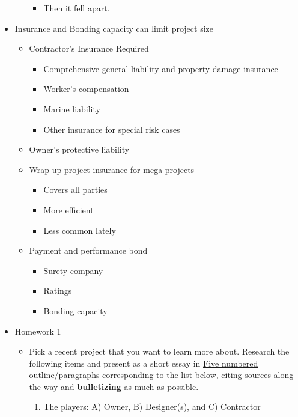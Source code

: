 \documentclass{article}
\begin{document}
\begin{itemize}
\begin{itemize}
\begin{itemize}
            \item Then it fell apart.
        \end{itemize}
    \end{itemize}
    \item Insurance and Bonding capacity can limit project size
    \begin{itemize}
        \item Contractor's Insurance Required
        \begin{itemize}
            \item Comprehensive general liability and property damage insurance
            \item Worker's compensation
            \item Marine liability
            \item Other insurance for special risk cases
        \end{itemize}
        \item Owner's protective liability
        \item Wrap-up project insurance for mega-projects
        \begin{itemize}
            \item Covers all parties
            \item More efficient
            \item Less common lately
        \end{itemize}
        \item Payment and performance bond
        \begin{itemize}
            \item Surety company
            \item Ratings
            \item Bonding capacity
        \end{itemize}
    \end{itemize}
    \item Homework 1
    \begin{itemize}
        \item Pick a recent project that you want to learn more about. Research the following items and present as a short essay in \underline{Five numbered outline/paragraphs corresponding to the list below}, citing sources along the way and \underline{\textbf{bulletizing}} as much as possible.
        \begin{enumerate}
            \item The players: A) Owner, B) Designer(s), and C) Contractor

\end{enumerate}
\end{itemize}
\end{itemize}
\end{document}
